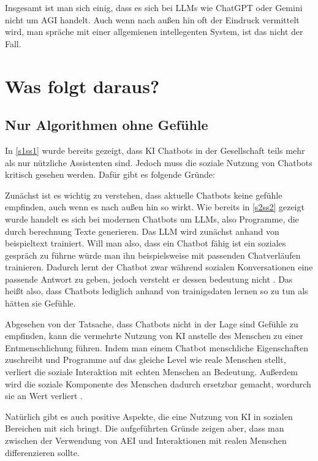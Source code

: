 	\noindent{}Insgesamt ist man sich einig, dass es sich bei LLMs wie ChatGPT oder Gemini nicht um AGI handelt. Auch wenn nach außen
	hin oft der Eindruck vermittelt wird, man spräche mit einer allgemienen intellegenten System, ist das nicht der Fall. 
	
	
\clearpage
\section{Was folgt daraus?}\label{s3}
	\subsection{Nur Algorithmen ohne Gefühle}\label{s3ss1}
	In \ref{s1ss1} wurde bereits gezeigt, dass KI Chatbots in der Gesellschaft teils mehr als nur nützliche Assistenten sind.
	Jedoch muss die soziale Nutzung von Chatbots kritisch gesehen werden. Dafür gibt es folgende Gründe:

	Zunächst ist es wichtig zu verstehen, dass aktuelle Chatbots keine gefühle empfinden, auch wenn es nach außen hin so wirkt.
	Wie bereits in \ref{s2ss2} gezeigt wurde handelt es sich bei modernen Chatbots um LLMs, also Programme, die durch berechnung
	Texte generieren. Das LLM wird zunächst anhand von beispieltext trainiert. Will man also, dass ein Chatbot fähig ist ein
	soziales gespräch zu führne würde man ihn beispielsweise mit passenden Chatverläufen trainieren. Dadurch lernt der Chatbot
	zwar während sozialen Konversationen eine passende Antwort zu geben, jedoch versteht er dessen bedeutung nicht \cite[S. 35-38]{goertzel23}.
	Das heißt also, dass Chatbots lediglich anhand von trainigsdaten lernen so zu tun als hätten sie Gefühle. 

	Abgesehen von der Tatsache, dass Chatbots nicht in der Lage sind Gefühle zu empfinden, kann die vermehrte Nutzung von KI anstelle
	des Menschen zu einer Entmenschlichung führen. Indem man einem Chatbot menschliche Eigenschaften zuschreibt und Programme auf
	das gleiche Level wie reale Menschen stellt, verliert die soziale Interaktion mit echten Menschen an Bedeutung. Außerdem wird die
	soziale Komponente des Menschen dadurch ersetzbar gemacht, wordurch sie an Wert verliert \cite{chen24}. 	 

	Natürlich gibt es auch positive Aspekte, die eine Nutzung von KI in sozialen Bereichen mit sich bringt. Die aufgeführten Gründe
	zeigen aber, dass man zwischen der Verwendung von AEI und Interaktionen mit realen Menschen differenzieren sollte.
	  
